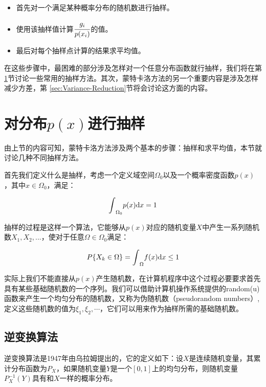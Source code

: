 \begin{itemize}
	\item 首先对一个满足某种概率分布的随机数进行抽样。
	\item 使用该抽样值计算$ \cfrac{g_i}{p(x_i)}$的值。
	\item 最后对每个抽样点计算的结果求平均值。
\end{itemize}

在这些步骤中，最困难的部分涉及怎样对一个任意分布函数就行抽样，我们将在第\ref{sec:Sampling-Random-Variables}节讨论一些常用的抽样方法。其次，蒙特卡洛方法的另一个重要内容是涉及怎样减少方差，第 \ref{sec:Variance-Reduction}节将会讨论这方面的内容。







\section{对分布$p(x)$进行抽样}\label{sec:Sampling-Random-Variables}
由上节的内容可知，蒙特卡洛方法涉及两个基本的步骤：抽样和求平均值，本节就讨论几种不同抽样方法。

首先我们定义什么是抽样，考虑一个定义域空间$\Omega_0$以及一个概率密度函数$p(x)$，其中$x\in\Omega_0$，满足：

\begin{equation}
	{\rm \int}_{\Omega_0}p(x){\rm d}x=1
\end{equation}

\noindent 抽样的过程是这样一个算法，它能够从$p(x)$对应的随机变量$X$中产生一系列随机数$X_1,X_2,...$，使对于任意$\Omega\in\Omega_0$满足：

\begin{equation}
	P\{X_k\in\Omega\}={\rm \int}_{\Omega}f(x){\rm d}x\leq 1
\end{equation}

\noindent 实际上我们不能直接从$p(x)$产生随机数，在计算机程序中这个过程必要要求首先具有某些基础随机数的一个序列。我们可以借助计算机操作系统提供的random(u)函数来产生一个均匀分布的随机数，又称为伪随机数（pseudorandom numbers）, 定义这些随机数的值为$\xi_1,\xi_2,\cdots$，它们可以用来作为抽样所需的基础随机数。




\subsection{逆变换算法}\label{sec:mc-inversion-method}
逆变换算法是1947年由乌拉姆提出的，它的定义如下：设$X$是连续随机变量，其累计分布函数为$P_X$，如果随机变量$Y$是一个$[0,1]$上的均匀分布，则随机变量$P^{-1}_X(Y)$具有和$X$一样的概率分布。

